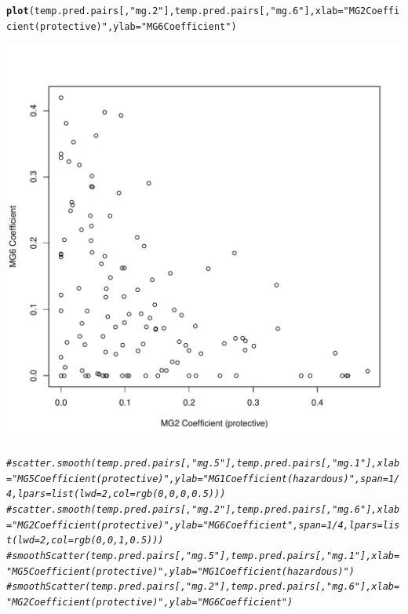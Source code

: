 \documentclass{article}\usepackage[]{graphicx}\usepackage[]{color}
\makeatletter
\def\maxwidth{ %
  \ifdim\Gin@nat@width>\linewidth
    \linewidth
  \else
    \Gin@nat@width
  \fi
}
\newcommand{\hlstr}[1]{\textcolor[rgb]{0.192,0.494,0.8}{#1}}%
\newcommand{\hlcom}[1]{\textcolor[rgb]{0.678,0.584,0.686}{\textit{#1}}}%
\newcommand{\hlstd}[1]{\textcolor[rgb]{0.345,0.345,0.345}{#1}}%
\newcommand{\hlkwc}[1]{\textcolor[rgb]{0.333,0.667,0.333}{#1}}%
\newcommand{\hlkwd}[1]{\textcolor[rgb]{0.737,0.353,0.396}{\textbf{#1}}}%
\newenvironment{kframe}{%
 \def\at@end@of@kframe{}%
 \ifinner\ifhmode%
  \def\at@end@of@kframe{\end{minipage}}%
  \begin{minipage}{\columnwidth}%
 \fi\fi%
 \def\FrameCommand##1{\hskip\@totalleftmargin \hskip-\fboxsep
 \colorbox{shadecolor}{##1}\hskip-\fboxsep
     \hskip-\linewidth \hskip-\@totalleftmargin \hskip\columnwidth}%
 \MakeFramed {\advance\hsize-\width
   \@totalleftmargin\z@ \linewidth\hsize
   \@setminipage}}%
 {\par\unskip\endMakeFramed%
 \at@end@of@kframe}
\newenvironment{knitrout}{}{} %
\makeatother
\begin{document}
\begin{knitrout}
{}


\begin{kframe}\begin{alltt}
\hlkwd{plot}\hlstd{(temp.pred.pairs[,}\hlstr{"mg.2"}\hlstd{], temp.pred.pairs[,}\hlstr{"mg.6"}\hlstd{],} \hlkwc{xlab} \hlstd{=} \hlstr{"MG2 Coefficient (protective)"}\hlstd{,} \hlkwc{ylab} \hlstd{=} \hlstr{"MG6 Coefficient"}\hlstd{)}
\end{alltt}
\end{kframe}

{\centering \includegraphics[width=\maxwidth]{figure/metagene-pairs-9} 

}


\begin{kframe}\begin{alltt}
\hlcom{#scatter.smooth(temp.pred.pairs[,"mg.5"], temp.pred.pairs[,"mg.1"], xlab = "MG5 Coefficient (protective)", ylab = "MG1 Coefficient (hazardous)", span = 1/4, lpars = list(lwd = 2, col = rgb(0, 0, 0, 0.5)))}
\hlcom{#scatter.smooth(temp.pred.pairs[,"mg.2"], temp.pred.pairs[,"mg.6"], xlab = "MG2 Coefficient (protective)", ylab = "MG6 Coefficient", span = 1/4, lpars = list(lwd = 2, col = rgb(0, 0, 1, 0.5)))}
\hlcom{#smoothScatter(temp.pred.pairs[,"mg.5"], temp.pred.pairs[,"mg.1"], xlab = "MG5 Coefficient (protective)", ylab = "MG1 Coefficient (hazardous)")}
\hlcom{#smoothScatter(temp.pred.pairs[,"mg.2"], temp.pred.pairs[,"mg.6"], xlab = "MG2 Coefficient (protective)", ylab = "MG6 Coefficient")}


\end{alltt}
\end{kframe}
\end{knitrout}
\end{document}
